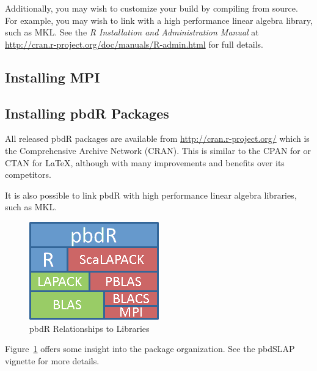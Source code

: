 Additionally, you may wish to customize your  build by compiling from source.  For example, you may wish to link  with a high performance linear algebra library, such as MKL.  See the \emph{R Installation and Administration Manual} at \url{http://cran.r-project.org/doc/manuals/R-admin.html} for full details.  


\subsection{Installing MPI}
   


\subsection{Installing pbdR Packages}
All released pbdR packages are available from \url{http://cran.r-project.org/} which is the Comprehensive  Archive Network (CRAN).  This is similar to the CPAN for  or CTAN for \LaTeX, although with many improvements and benefits over its competitors.

It is also possible to link pbdR with high performance linear algebra libraries, such as MKL.
\begin{figure}[h]
\centering
\includegraphics[scale=.7]{_all/pics/libs.png}
\caption{pbdR Relationships to Libraries}\label{fig:pbd}
\end{figure}
Figure~\ref{fig:pbd} offers some insight into the package organization.  See the pbdSLAP vignette for more details.